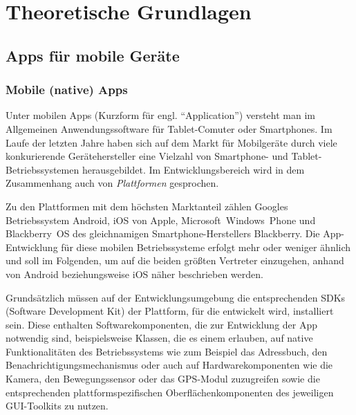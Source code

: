 \chapter{Theoretische Grundlagen}

\section{Apps für mobile Geräte} %

\subsection{Mobile (native) Apps} \label{native}
Unter mobilen Apps (Kurzform für engl. \enquote{Application}) versteht man im Allgemeinen Anwendungssoftware für Tablet-Comuter oder Smartphones. 
Im Laufe der letzten Jahre haben sich auf dem Markt für Mobilgeräte durch viele konkurierende Gerätehersteller eine Vielzahl von Smartphone- und Tablet-Betriebssystemen herausgebildet. 
Im Entwicklungsbereich wird in dem Zusammenhang auch von \emph{Plattformen} gesprochen.

Zu den Plattformen mit dem höchsten Marktanteil zählen Googles Betriebssystem Android, iOS von Apple, Microsoft~Windows~Phone und Blackberry~OS des gleichnamigen Smartphone-Herstellers Blackberry.\cite{platforms-marketshare}
Die App-Entwicklung für diese mobilen Betriebssysteme erfolgt mehr oder weniger ähnlich und soll im Folgenden, um auf die beiden größten Vertreter einzugehen, anhand von Android beziehungsweise iOS näher beschrieben werden.

Grundsätzlich müssen auf der Entwicklungsumgebung die entsprechenden SDKs (Software Development Kit) der Plattform, für die entwickelt wird, installiert sein. 
Diese enthalten Softwarekomponenten, die zur Entwicklung der App notwendig sind, beispielsweise Klassen, die es einem erlauben, auf native Funktionalitäten des Betriebssystems wie zum Beispiel das Adressbuch, den Benachrichtigungsmechanismus oder auch auf Hardwarekomponenten wie die Kamera, den Bewegungssensor oder das GPS-Modul zuzugreifen sowie die entsprechenden plattformspezifischen Oberflächenkomponenten des jeweiligen GUI-Toolkits zu nutzen.

